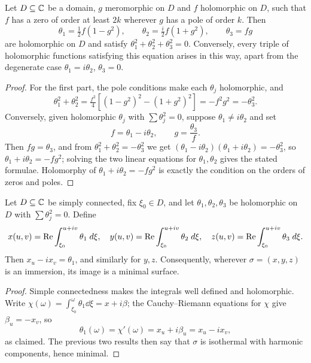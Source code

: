 \documentclass[a4paper]{scrartcl}
\begin{document}
\begin{lemma}
    Let $D \subseteq \mathbb{C}$ be a domain, $g$ meromorphic on $D$ and $f$ holomorphic on $D$, such that $f$ has a zero of order at least $2k$ wherever $g$ has a pole of order $k$. Then
    $$
    \theta_1 = \tfrac12 f\left(1 - g^2\right), \qquad \theta_2 = \tfrac{i}{2}f\left(1+g^2\right), \qquad \theta_3 = fg
    $$
    are holomorphic on $D$ and satisfy $\theta_1^2+\theta_2^2+\theta_3^2 = 0$. Conversely, every triple of holomorphic functions satisfying this equation arises in this way, apart from the degenerate case $\theta_1 = i\theta_2$, $\theta_3 = 0$.
\end{lemma}
\begin{proof}
    For the first part, the pole conditions make each $\theta_j$ holomorphic, and
    $$
    \theta_1^2 + \theta_2^2 = \tfrac{f^2}{4}\left[(1-g^2)^2 - (1+g^2)^2\right] = -f^2g^2 = -\theta_3^2.
    $$
    Conversely, given holomorphic $\theta_j$ with $\sum\theta_j^2 = 0$, suppose $\theta_1 \neq i\theta_2$ and set
    $$
    f = \theta_1 - i\theta_2, \qquad g = \frac{\theta_3}{f}.
    $$
    Then $fg = \theta_3$, and from $\theta_1^2+\theta_2^2 = -\theta_3^2$ we get $(\theta_1-i\theta_2)(\theta_1+i\theta_2) = -\theta_3^2$, so $\theta_1 + i\theta_2 = -fg^2$; solving the two linear equations for $\theta_1,\theta_2$ gives the stated formulae. Holomorphy of $\theta_1+i\theta_2 = -fg^2$ is exactly the condition on the orders of zeros and poles.
\end{proof}

\begin{proposition}
    Let $D \subseteq \mathbb{C}$ be simply connected, fix $\xi_0 \in D$, and let $\theta_1,\theta_2,\theta_3$ be holomorphic on $D$ with $\sum \theta_j^2 = 0$. Define
    $$
    x(u,v) = \operatorname{Re}\int_{\xi_0}^{u+iv}\theta_1 \; d \xi, \quad y(u,v) = \operatorname{Re}\int_{\xi_0}^{u+iv}\theta_2\; d\xi, \quad z(u,v) = \operatorname{Re}\int_{\xi_0}^{u+iv}\theta_3\; d\xi.
    $$
    Then $x_u - ix_v = \theta_1$, and similarly for $y,z$. Consequently, wherever $\sigma = (x,y,z)$ is an immersion, its image is a minimal surface.
\end{proposition}
\begin{proof}
    Simple connectedness makes the integrals well defined and holomorphic. Write $\chi(\omega) = \int_{\xi_0}^\omega\theta_1\dd\xi = x + i\beta$; the Cauchy--Riemann equations for $\chi$ give $\beta_u = -x_v$, so
    $$
    \theta_1(\omega) = \chi'(\omega) = x_u + i\beta_u = x_u - ix_v,
    $$
    as claimed. The previous two results then say that $\sigma$ is isothermal with harmonic components, hence minimal.
\end{proof}
\end{document}
